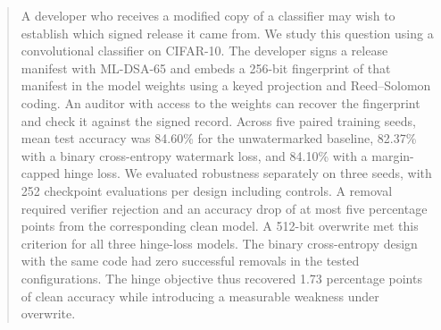 \begin{abstract}
A developer who receives a modified copy of a classifier may wish to establish which signed release it came from. We study this question using a convolutional classifier on CIFAR-10. The developer signs a release manifest with ML-DSA-65 and embeds a 256-bit fingerprint of that manifest in the model weights using a keyed projection and Reed--Solomon coding. An auditor with access to the weights can recover the fingerprint and check it against the signed record. Across five paired training seeds, mean test accuracy was 84.60\% for the unwatermarked baseline, 82.37\% with a binary cross-entropy watermark loss, and 84.10\% with a margin-capped hinge loss. We evaluated robustness separately on three seeds, with 252 checkpoint evaluations per design including controls. A removal required verifier rejection and an accuracy drop of at most five percentage points from the corresponding clean model. A 512-bit overwrite met this criterion for all three hinge-loss models. The binary cross-entropy design with the same code had zero successful removals in the tested configurations. The hinge objective thus recovered 1.73 percentage points of clean accuracy while introducing a measurable weakness under overwrite.
\end{abstract}
